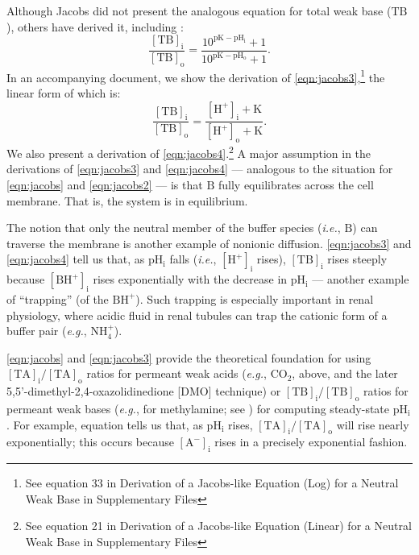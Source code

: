 \documentclass[fleqn,10pt]{physiome}
\begin{document}
Although Jacobs did not present the analogous equation for total weak base ($\mathrm{TB}$), others have derived it, including \cite{roos1981intracellular}:
\begin{equation}
\dfrac{\mathrm{[TB]_i}}{\mathrm{[TB]_o}}=\dfrac{10^{\mathrm{pK}-\mathrm{pH_i}}+1}{10^{\mathrm{pK}-\mathrm{pH_o}}+1}.
\label{eqn:jacobs3}
\end{equation}
In an accompanying document, we show the derivation of \autoref{eqn:jacobs3},\footnote{See equation 33 in Derivation of a Jacobs-like Equation (Log) for a Neutral Weak Base in Supplementary Files} the linear form of which is:
\begin{equation}
\dfrac{\mathrm{[TB]_i}}{\mathrm{[TB]_o}}=\dfrac{\mathrm{[H^+]_i}+\mathrm{K}}{\mathrm{[H^+]_o}+\mathrm{K}}.
\label{eqn:jacobs4}
\end{equation}
We also present a derivation of \autoref{eqn:jacobs4}.\footnote{See equation 21 in Derivation of a Jacobs-like Equation (Linear) for a Neutral Weak Base in Supplementary Files} A major assumption in the derivations of \autoref{eqn:jacobs3} and \autoref{eqn:jacobs4} --- analogous to the situation for \autoref{eqn:jacobs} and \autoref{eqn:jacobs2} --- is that $\mathrm{B}$ fully equilibrates across the cell membrane. That is, the system is in equilibrium.

The notion that only the neutral member of the buffer species (\emph{i.e.}, $\mathrm{B}$) can traverse the membrane is another example of nonionic diffusion. \autoref{eqn:jacobs3} and \autoref{eqn:jacobs4} tell us that, as $\mathrm{pH_i}$ falls (\emph{i.e.}, $\mathrm{[H^+]_i}$ rises), $\mathrm{[TB]_i}$ rises steeply because $\mathrm{[BH^+]_i}$ rises exponentially with the decrease in $\mathrm{pH_i}$ --- another example of ``trapping'' (of the $\mathrm{BH^+}$). Such trapping is especially important in renal physiology, where acidic fluid in renal tubules can trap the cationic form of a buffer pair (\emph{e.g.}, $\mathrm{NH_4^+}$).

\autoref{eqn:jacobs} and \autoref{eqn:jacobs3} provide the theoretical foundation for using $\mathrm{[TA]_i}/\mathrm{[TA]_o}$ ratios for permeant weak acids (\emph{e.g.}, $\mathrm{CO_2}$, above, and the later 5,5'-dimethyl-2,4-oxazolidinedione [DMO] technique) or $\mathrm{[TB]_i}/\mathrm{[TB]_o}$ ratios for permeant weak bases (\emph{e.g.}, for methylamine; see \cite{boron1976comparison}) for computing steady-state $\mathrm{pH_i}$. For example, equation  tells us that, as $\mathrm{pH_i}$ rises, $\mathrm{[TA]_i}/\mathrm{[TA]_o}$ will rise nearly exponentially; this occurs because $\mathrm{[A^-]_i}$ rises in a precisely exponential fashion.
\end{document}
